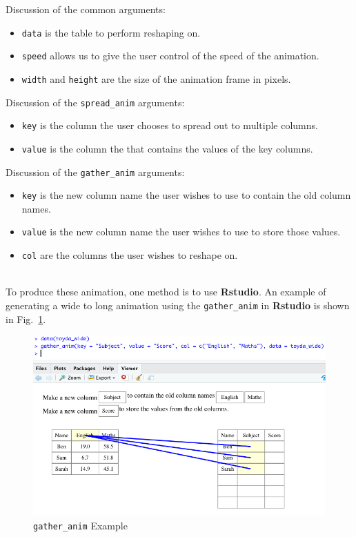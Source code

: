 \newpage

Discussion of the common arguments:
\begin{itemize}
    \item \texttt{data} is the table to perform reshaping on.
    \item \texttt{speed} allows us to give the user control of the speed of the animation.
    \item \texttt{width} and \texttt{height} are the size of the animation frame in pixels.
\end{itemize}

Discussion of the \texttt{spread\_anim} arguments:
\begin{itemize}
    \item \texttt{key} is the column the user chooses to spread out to multiple columns.
    \item \texttt{value} is the column the that contains the values of the key columns.
\end{itemize}

Discussion of the \texttt{gather\_anim} arguments:

\begin{itemize}
    \item \texttt{key} is the new column name the user wishes to use to contain the old column names.
    \item \texttt{value} is the new column name the user wishes to use to store those values.
    \item \texttt{col} are the columns the user wishes to reshape on.
\end{itemize}
\\

To produce these animation, one method is to use \textbf{Rstudio}. An example of generating a wide to long animation using the \texttt{gather\_anim} in \textbf{Rstudio} is shown in Fig.~\ref{fig:gatherrstudio}.

\begin{figure}[H]
    \centering
    \includegraphics[scale = 0.5]{Masters-Thesis/img/gatherrstudio.png}
    \caption{\texttt{gather\_anim} Example}
    \label{fig:gatherrstudio}
\end{figure}

